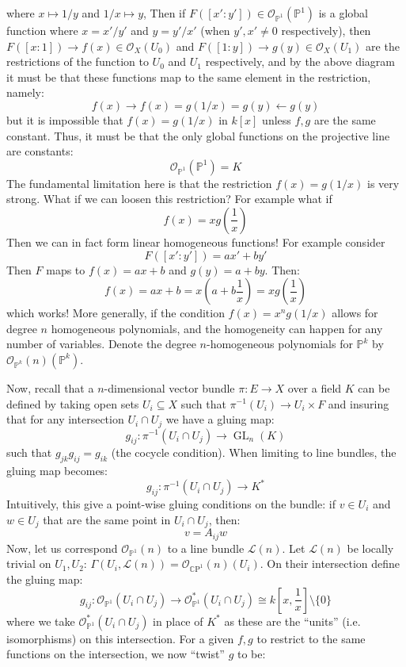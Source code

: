 \documentclass{book}
\renewcommand{\P}{{\mathbb{P}}}
\newcommand{\CL}{{\mathcal{L}}}
\newcommand{\CO}{{\mathcal{O}}}
\newcommand{\CP}{\mathbb{C}\mathrm{P}}
\newcommand{\GL}{{\operatorname{GL}}}
\newcommand{\sse}{\subseteq}
\begin{document}
where $x \mapsto 1/y$ and $1/x \mapsto y$, Then if $F([x':y']) \in
\CO_{\P^1}(\P^1)$ is a global function where $x = x'/y'$ and $y  =y'/x'$ (when $y',x'\ne 0$ respectively), then $F([x:1]) \to f(x) \in \CO_X(U_0)$ and $F([1:y]) \to g(y) \in \CO_X(U_1)$
are the restrictions of the function to $U_0$ and $U_1$ respectively, and by the above diagram it must be that
these functions map to the same element in the restriction, namely:
\[
  f(x) \to f(x) = g(1/x) = g(y) \leftarrow g(y)
\]
but it is impossible that $f(x) = g(1/x)$ in $k[x]$ unless $f,g$ are the same constant. Thus, it must be that the only
global functions on the projective line are constants:
\[
  \CO_{\P^1}(\P^1) = K
\]
The fundamental limitation here is that the restriction $f(x) = g(1/x)$ is very strong. What if we can loosen
this restriction? For example what if
\[
  f(x) = xg\left(\frac{1}{x}\right)
\]
Then we can in fact form linear homogeneous functions! For example consider
\[
  F([x':y']) = ax'+by'
\]
Then $F$ maps to $f(x) = ax+b$ and $g(y) = a + by$. Then:
\[
  f(x)= ax+b = x\left(a + b \frac{1}{x}\right)  = xg\left(\frac{1}{x}\right)
\]
which works! More generally, if the condition $f(x) = x^ng(1/x)$ allows for degree $n$ homogeneous
polynomials, and the homogeneity can happen for any number of variables. Denote the degree $n$-homogeneous
polynomials for $\P^k$ by $\CO_{\P^k}(n)(\P^k)$.

Now, recall that a $n$-dimensional vector bundle $\pi: E \to X$ over a field $K$ can be defined by taking open
sets $U_i \sse X$ such that $\pi^{-1}(U_i) \to U_i\times F$ and insuring that for any intersection $U_i\cap
U_j$ we have a gluing map:
\[
  g_{ij}: \pi^{-1}(U_i\cap U_j) \to \GL_n(K)
\]
such that $g_{jk}g_{ij} = g_{ik}$ (the cocycle condition). When limiting
to line bundles, the gluing map becomes:
\[
  g_{ij}: \pi^{-1}(U_i\cap U_j) \to K^*
\]
Intuitively, this give a point-wise gluing conditions on the bundle: if $v \in U_i$ and $w \in U_j$ that are
the same point in $U_i\cap U_j$, then:
\[
  v = A_{ij}w
\]
Now, let us correspond $\CO_{\P^1}(n)$ to a line bundle $\CL(n)$. Let $\CL(n)$ be
locally trivial on $U_1, U_2$: $\Gamma(U_i, \CL(n)) = \CO_{\CP^1}(n)(U_i)$. On their intersection define the gluing
map: \[ g_{ij}: \CO_{\P^1}(U_i\cap U_j) \to \CO_{\P^1}^*(U_i\cap U_j) \cong k\left[x,
\frac{1}{x}\right]\setminus\{0\} \] where we take $\CO_{\P^1}^*(U_i\cap U_j)$ in place of $K^*$ as these are
the ``units'' (i.e. isomorphisms) on this intersection. For a given $f,g$ to restrict to the same functions on
the intersection, we now ``twist'' $g$ to be:
\end{document}
